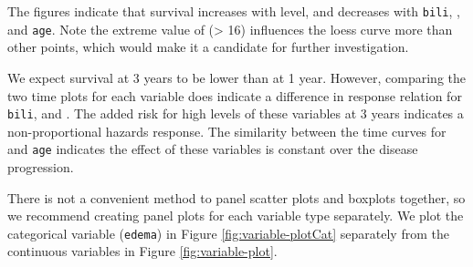 \documentclass[article]{jss}
\begin{document}
The figures indicate that survival increases with  level,
and decreases with \texttt{bili}, ,  and
\texttt{age}. Note the extreme value of 
(\textgreater{} 16) influences the loess curve more than other points,
which would make it a candidate for further investigation.

We expect survival at 3 years to be lower than at 1 year. However,
comparing the two time plots for each variable does indicate a
difference in response relation for \texttt{bili},  and
. The added risk for high levels of these variables
at 3 years indicates a non-proportional hazards response. The similarity
between the time curves for  and \texttt{age} indicates
the effect of these variables is constant over the disease progression.

There is not a convenient method to panel scatter plots and boxplots
together, so we recommend creating panel plots for each variable type
separately. We plot the categorical variable (\texttt{edema}) in Figure
\ref{fig:variable-plotCat} separately from the continuous variables in
Figure \ref{fig:variable-plot}.
\end{document}

